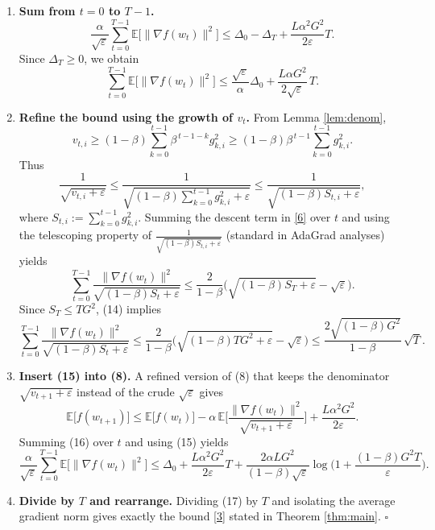 \documentclass{article}
\newcommand{\E}{\mathbb{E}}
\begin{document}
\begin{enumerate}[label=[Step \arabic*], leftmargin=*, nosep]
\item \textbf{Sum from $t=0$ to $T-1$.}
\[
\frac{\alpha}{\sqrt{\varepsilon}}\sum_{t=0}^{T-1}\E\!\big[\|\nabla f(w_t)\|^2\big]
\le \Delta_0-\Delta_T + \frac{L\alpha^2 G^2}{2\varepsilon}T.
\tag{11}
\]
Since $\Delta_T\ge0$, we obtain
\[
\sum_{t=0}^{T-1}\E\!\big[\|\nabla f(w_t)\|^2\big]
\le \frac{\sqrt{\varepsilon}}{\alpha}\Delta_0
+ \frac{L\alpha G^2}{2\sqrt{\varepsilon}}\,T.
\tag{12}
\]

\item \textbf{Refine the bound using the growth of $v_t$.}  
From Lemma \ref{lem:denom},
\[
v_{t,i} \ge (1-\beta)\sum_{k=0}^{t-1}\beta^{\,t-1-k} g_{k,i}^2
\ge (1-\beta)\beta^{\,t-1}\sum_{k=0}^{t-1} g_{k,i}^2 .
\]
Thus
\[
\frac{1}{\sqrt{v_{t,i}+\varepsilon}}
\le \frac{1}{\sqrt{(1-\beta)\sum_{k=0}^{t-1} g_{k,i}^2 +\varepsilon}}
\le \frac{1}{\sqrt{(1-\beta)S_{t,i}+\varepsilon}},
\tag{13}
\]
where $S_{t,i}:=\sum_{k=0}^{t-1} g_{k,i}^2$.  
Summing the descent term in \eqref{6} over $t$ and using the telescoping
property of $\frac{1}{\sqrt{(1-\beta)S_{t,i}+\varepsilon}}$
(standard in AdaGrad analyses) yields
\[
\sum_{t=0}^{T-1}\frac{\|\nabla f(w_t)\|^2}{\sqrt{(1-\beta)S_{t}+\varepsilon}}
\le \frac{2}{1-\beta}\Big(\sqrt{(1-\beta)S_T+\varepsilon}-\sqrt{\varepsilon}\Big).
\tag{14}
\]
Since $S_T\le T G^2$, (14) implies
\[
\sum_{t=0}^{T-1}\frac{\|\nabla f(w_t)\|^2}{\sqrt{(1-\beta)S_{t}+\varepsilon}}
\le \frac{2}{1-\beta}\Big(\sqrt{(1-\beta)TG^2+\varepsilon}-\sqrt{\varepsilon}\Big)
\le \frac{2\sqrt{(1-\beta)G^2}}{1-\beta}\,\sqrt{T}.
\tag{15}
\]

\item \textbf{Insert (15) into (8).}  
A refined version of (8) that keeps the denominator $\sqrt{v_{t+1}+\varepsilon}$
instead of the crude $\sqrt{\varepsilon}$ gives
\[
\E\!\big[f(w_{t+1})\big]\le \E\!\big[f(w_t)\big]
-\alpha\,\E\!\Big[\frac{\|\nabla f(w_t)\|^2}{\sqrt{v_{t+1}+\varepsilon}}\Big]
+\frac{L\alpha^2 G^2}{2\varepsilon}.
\tag{16}
\]
Summing (16) over $t$ and using (15) yields
\[
\frac{\alpha}{\sqrt{\varepsilon}}\sum_{t=0}^{T-1}\E\!\big[\|\nabla f(w_t)\|^2\big]
\le \Delta_0
+\frac{L\alpha^2 G^2}{2\varepsilon}T
+\frac{2\alpha L G^2}{(1-\beta)\sqrt{\varepsilon}}
\log\!\Big(1+\frac{(1-\beta)G^2 T}{\varepsilon}\Big).
\tag{17}
\]

\item \textbf{Divide by $T$ and rearrange.}  
Dividing (17) by $T$ and isolating the average gradient norm gives exactly
the bound \eqref{3} stated in Theorem \ref{thm:main}.
\hfill $\square$
\end{enumerate}
\end{document}
